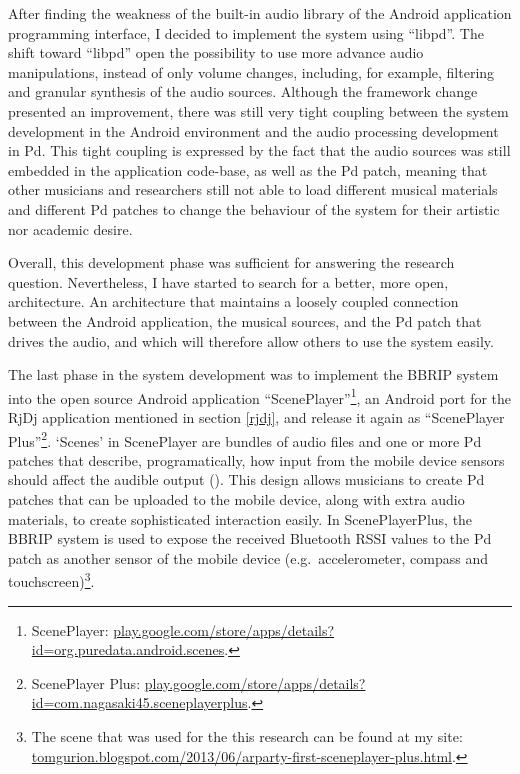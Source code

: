 \documentclass[a4paper,11pt]{article}
\begin{document}
{After finding the weakness of the built-in audio library of the Android application programming interface, I decided to implement the system using ``libpd''.
The shift toward ``libpd'' open the possibility to use more advance audio manipulations, instead of only volume changes, including, for example, filtering and granular synthesis of the audio sources.
Although the framework change presented an improvement, there was still very tight coupling between the system development in the Android environment and the audio processing development in Pd.
This tight coupling is expressed by the fact that the audio sources was still embedded in the application code-base, as well as the Pd patch, meaning that other musicians and researchers still not able to load different musical materials and different Pd patches to change the behaviour of the system for their artistic nor academic desire.

Overall, this development phase was sufficient for answering the research question.
Nevertheless, I have started to search for a better, more open, architecture.
An architecture that maintains a loosely coupled connection between the Android application, the musical sources, and the Pd patch that drives the audio, and which will therefore allow others to use the system easily.

The last phase in the system development was to implement the BBRIP system into the open source Android application ``ScenePlayer''\footnote{ScenePlayer: \href{http://play.google.com/store/apps/details?id=org.puredata.android.scenes}{play.google.com/store/apps/details?id=org.puredata.android.scenes}.}, an Android port for the RjDj application mentioned in section \ref{rjdj}, and release it again as ``ScenePlayer Plus''\footnote{ScenePlayer Plus: \href{http://play.google.com/store/apps/details?id=com.nagasaki45.sceneplayerplus}{play.google.com/store/apps/details?id=com.nagasaki45.sceneplayerplus}.}.
`Scenes' in ScenePlayer are bundles of audio files and one or more Pd patches that describe, programatically, how input from the mobile device sensors should affect the audible output (\cite[p. 29]{brinkmann12}).
This design allows musicians to create Pd patches that can be uploaded to the mobile device, along with extra audio materials, to create sophisticated interaction easily.
In ScenePlayerPlus, the BBRIP system is used to expose the received Bluetooth RSSI values to the Pd patch as another sensor of the mobile device (e.g.\ accelerometer, compass and touchscreen)\footnote{The scene that was used for the this research can be found at my site: \href{http://tomgurion.blogspot.com/2013/06/arparty-first-sceneplayer-plus.html}{tomgurion.blogspot.com/2013/06/arparty-first-sceneplayer-plus.html}.}.

}
\end{document}
